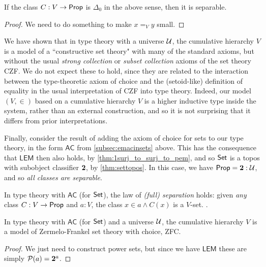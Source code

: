 \begin{lem}\label{lem:Delta0sep}
If the class $C: V \to \mathsf{Prop}$ is $\Delta_0$ in the above sense, then it is separable.
\end{lem}

\begin{proof}
We need to do something to make $x=_V y$ small.
\end{proof}

We have shown that in type theory with a universe $\mathcal{U}$, the cumulative hierarchy $V$ is a model of a ``constructive set theory" with many of the standard axioms, but without the usual \emph{strong collection} or \emph{subset collection} axioms of the set theory CZF.  We do not expect these to hold, since they are related to the interaction between the type-theoretic axiom of choice and the (setoid-like) definition of equality in the usual interpretation of CZF into type theory.  Indeed, our model $(V,\in)$ based on a cumulative hierarchy $V$ is a higher inductive type inside the system, rather than an external construction, and so it is not surprising that it differs from prior interpretations.

Finally, consider the result of adding the axiom of choice for sets to our type theory, in the form  $\mathsf{AC}$ from \autoref{subsec:emacinsets} above.  This has the consequence that $\mathsf{LEM}$ then also holds, by \autoref{thm:1surj_to_surj_to_pem}, and so $\mathsf{Set}$ is a topos with subobject classifier $\mathbf{2}$, by \autoref{thm:settopos}.  In this case, we have $\mathsf{Prop} = \mathbf{2}:\mathcal{U}$, and so \emph{all classes are separable}.

\begin{lem}\label{lem:fullsep}
In type theory with $\mathsf{AC}$ (for $\mathsf{Set}$), the law of \emph{(full) separation} holds: given \emph{any} class $C : V \to \mathsf{Prop}$ and $a : V$, the class $x \in a \land C(x)$ is a $V$-set. .
\end{lem}

\begin{thm}\label{thm:zfc}
In type theory with $\mathsf{AC}$ (for $\mathsf{Set}$) and a universe $\mathcal{U}$, the cumulative hierarchy $V$ is a model of Zermelo-Frankel set theory with choice, ZFC.
\end{thm}

\begin{proof}
We just need to construct power sets, but since we have $\mathsf{LEM}$ these are simply $\mathcal{P}(a) = \mathbf{2}^{a}$.
\end{proof}



